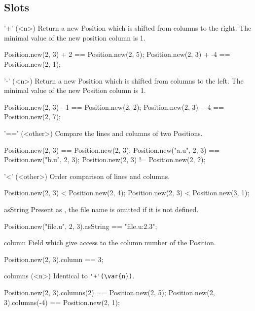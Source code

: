 \subsection{Slots}

\begin{urbiscriptapi}
\item['+'](<n>)%
  Return a new Position which is shifted from  columns to the
  right.  The minimal value of the new position column is 1.
\begin{urbiassert}
Position.new(2, 3) + 2 == Position.new(2, 5);
Position.new(2, 3) + -4 == Position.new(2, 1);
\end{urbiassert}

\item['-'](<n>)%
  Return a new Position which is shifted from  columns to the
  left.  The minimal value of the new Position column is 1.
\begin{urbiassert}
Position.new(2, 3) - 1 == Position.new(2, 2);
Position.new(2, 3) - -4 == Position.new(2, 7);
\end{urbiassert}

\item['=='](<other>)%
  Compare the lines and columns of two Positions.
\begin{urbiassert}
Position.new(2, 3) == Position.new(2, 3);
Position.new("a.u", 2, 3) == Position.new("b.u", 2, 3);
Position.new(2, 3) != Position.new(2, 2);
\end{urbiassert}

\item['<'](<other>)%
  Order comparison of lines and columns.
\begin{urbiassert}
Position.new(2, 3) < Position.new(2, 4);
Position.new(2, 3) < Position.new(3, 1);
\end{urbiassert}

\item[asString]
  Present as , the file name is
  omitted if it is not defined.
\begin{urbiassert}
Position.new("file.u", 2, 3).asString == "file.u:2.3";
\end{urbiassert}

\item[column]
  Field which give access to the column number of the Position.
\begin{urbiassert}
Position.new(2, 3).column == 3;
\end{urbiassert}

\item[columns](<n>)%
  Identical to \lstinline|'+'(\var{n})|.
\begin{urbiassert}
Position.new(2, 3).columns(2) == Position.new(2, 5);
Position.new(2, 3).columns(-4) == Position.new(2, 1);
\end{urbiassert}


\end{urbiscriptapi}

